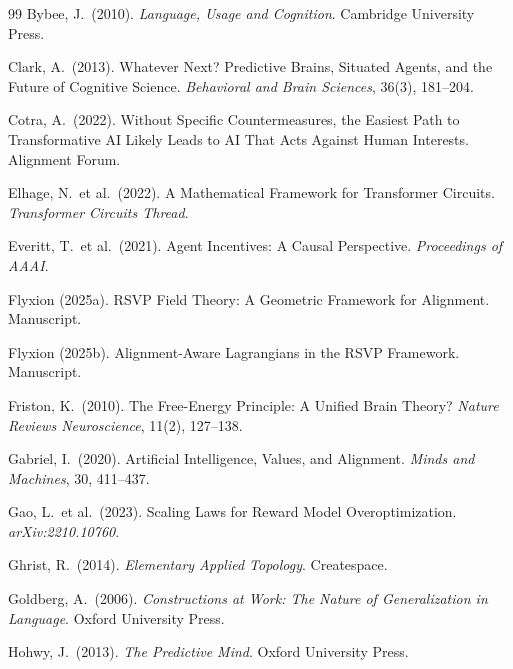 \documentclass[12pt]{article}
\theoremstyle{definition}
\begin{document}
\begin{thebibliography}{99}
Bybee, J.\ (2010).
\newblock \emph{Language, Usage and Cognition}.
\newblock Cambridge University Press.

Clark, A.\ (2013).
\newblock Whatever Next? Predictive Brains, Situated Agents, and the Future of
Cognitive Science.
\newblock \emph{Behavioral and Brain Sciences}, 36(3), 181--204.

Cotra, A.\ (2022).
\newblock Without Specific Countermeasures, the Easiest Path to Transformative AI
Likely Leads to AI That Acts Against Human Interests.
\newblock Alignment Forum.

Elhage, N.\ et al.\ (2022).
\newblock A Mathematical Framework for Transformer Circuits.
\newblock \emph{Transformer Circuits Thread}.

Everitt, T.\ et al.\ (2021).
\newblock Agent Incentives: A Causal Perspective.
\newblock \emph{Proceedings of AAAI}.

Flyxion (2025a).
\newblock RSVP Field Theory: A Geometric Framework for Alignment.
\newblock Manuscript.

Flyxion (2025b).
\newblock Alignment-Aware Lagrangians in the RSVP Framework.
\newblock Manuscript.

Friston, K.\ (2010).
\newblock The Free-Energy Principle: A Unified Brain Theory?
\newblock \emph{Nature Reviews Neuroscience}, 11(2), 127--138.

Gabriel, I.\ (2020).
\newblock Artificial Intelligence, Values, and Alignment.
\newblock \emph{Minds and Machines}, 30, 411--437.

Gao, L.\ et al.\ (2023).
\newblock Scaling Laws for Reward Model Overoptimization.
\newblock \emph{arXiv:2210.10760}.

Ghrist, R.\ (2014).
\newblock \emph{Elementary Applied Topology}.
\newblock Createspace.

Goldberg, A.\ (2006).
\newblock \emph{Constructions at Work: The Nature of Generalization in Language}.
\newblock Oxford University Press.

Hohwy, J.\ (2013).
\newblock \emph{The Predictive Mind}.
\newblock Oxford University Press.


\end{thebibliography}
\end{document}
